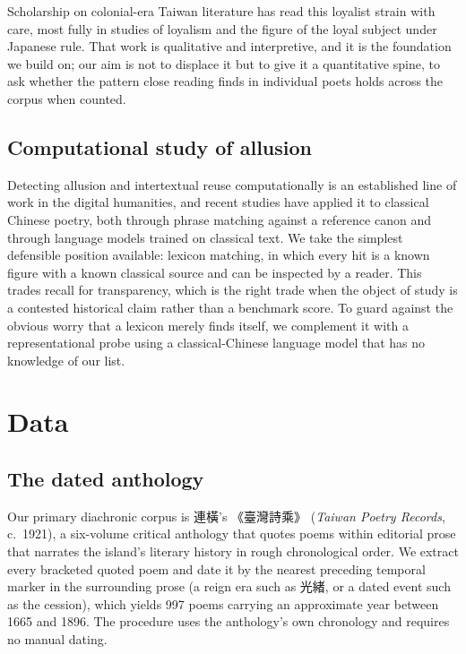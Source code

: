 \documentclass[10pt,twocolumn]{article}
\begin{document}
Scholarship on colonial-era Taiwan literature has read this loyalist strain with care, most
fully in studies of loyalism and the figure of the loyal subject under Japanese rule. That
work is qualitative and interpretive, and it is the foundation we build on; our aim is not to
displace it but to give it a quantitative spine, to ask whether the pattern close reading
finds in individual poets holds across the corpus when counted.

\subsection{Computational study of allusion}
Detecting allusion and intertextual reuse computationally is an established line of work in
the digital humanities, and recent studies have applied it to classical Chinese poetry, both
through phrase matching against a reference canon and through language models trained on
classical text. We take the simplest defensible position available: lexicon matching, in
which every hit is a known figure with a known classical source and can be inspected by a
reader. This trades recall for transparency, which is the right trade when the object of
study is a contested historical claim rather than a benchmark score. To guard against the
obvious worry that a lexicon merely finds itself, we complement it with a representational
probe using a classical-Chinese language model that has no knowledge of our list.

\section{Data}
\subsection{The dated anthology}
Our primary diachronic corpus is \mbox{連橫}'s \mbox{《臺灣詩乘》} (\emph{Taiwan Poetry
Records}, c.\ 1921), a six-volume critical anthology that quotes poems within editorial prose
that narrates the island's literary history in rough chronological order. We extract every
bracketed quoted poem and date it by the nearest preceding temporal marker in the surrounding
prose (a reign era such as \mbox{光緒}, or a dated event such as the cession), which yields
997 poems carrying an approximate year between 1665 and 1896. The procedure uses the
anthology's own chronology and requires no manual dating.
\end{document}
